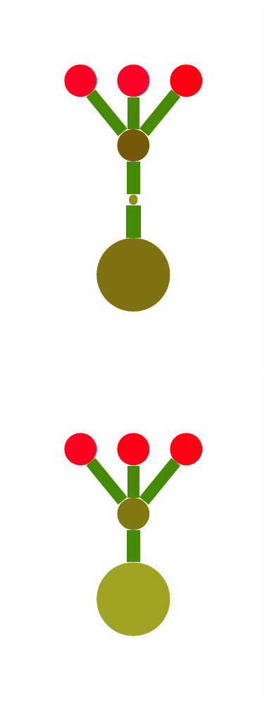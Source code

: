 \documentclass[a4paper,10pt]{article}
\begin{document}
\begin{figure}[t]
  \centering
  \includegraphics[scale=.26]{../figures/vector/2-2-initProgram-0.pdf}  
  \includegraphics[scale=.26]{../figures/vector/2-2-initProgram-1.pdf}

\end{figure}
\end{document}
